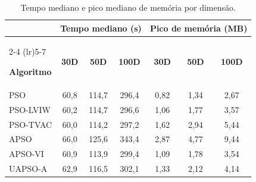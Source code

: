 \begin{table}[!t]
    \centering
    \caption{Tempo mediano e pico mediano de memória por dimensão.}
    \label{tab:tempo_memoria_dimensao}

    \scriptsize
    \renewcommand{\arraystretch}{0.85}
    \setlength{\tabcolsep}{4pt}

    \begin{tabular*}{\textwidth}{
        @{\extracolsep{\fill}}
        lccccc@{\hspace{2pt}}c
        @{}
    }
        \toprule
        & \multicolumn{3}{c}{\textbf{Tempo mediano (s)}}
        & \multicolumn{3}{c}{\textbf{Pico de memória (MB)}} \\

        \cmidrule(lr){2-4}
        \cmidrule(lr){5-7}

        \textbf{Algoritmo}
        & \textbf{30D}
        & \textbf{50D}
        & \textbf{100D}
        & \textbf{30D}
        & \textbf{50D}
        & \textbf{100D} \\

        \midrule
        PSO      & 60,8 & 114,7 & 296,4 & 0,82 & 1,34 & 2,67 \\
        PSO-LVIW & 60,2 & 114,7 & 296,6 & 1,06 & 1,77 & 3,57 \\
        PSO-TVAC & 60,0 & 114,2 & 297,2 & 1,62 & 2,94 & 5,44 \\
        APSO     & 66,0 & 125,6 & 343,4 & 2,87 & 4,77 & 9,44 \\
        APSO-VI  & 60,9 & 113,9 & 299,4 & 1,09 & 1,78 & 3,54 \\
        UAPSO-A  & 62,9 & 116,5 & 302,1 & 1,33 & 2,12 & 4,14 \\
        \bottomrule
    \end{tabular*}
\end{table}
